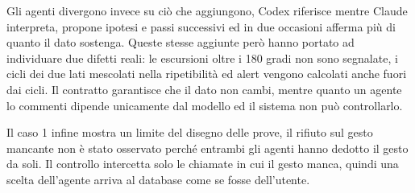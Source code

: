 Gli agenti divergono invece su ciò che aggiungono, Codex riferisce mentre Claude
interpreta, propone ipotesi e passi successivi ed in due occasioni afferma più di
quanto il dato sostenga. Queste stesse aggiunte però hanno portato ad individuare
due difetti reali: le escursioni oltre i 180 gradi non sono segnalate, i cicli dei due
lati mescolati nella ripetibilità ed alert vengono calcolati anche fuori dai cicli. Il
contratto garantisce che il dato non cambi, mentre quanto un agente lo commenti
dipende unicamente dal modello ed il sistema non può controllarlo.

Il caso 1 infine mostra un limite del disegno delle prove, il rifiuto sul gesto
mancante non è stato osservato perché entrambi gli agenti hanno dedotto il gesto
da soli. Il controllo intercetta solo le chiamate in cui il gesto manca, quindi
una scelta dell'agente arriva al database come se fosse dell'utente.
